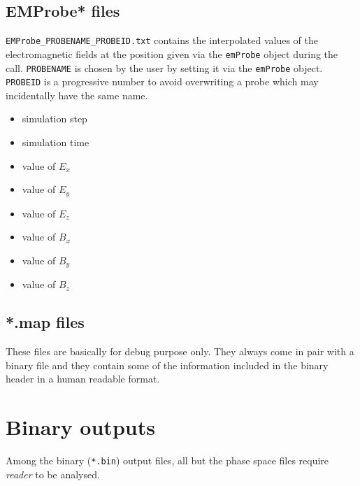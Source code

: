 \documentclass[11pt,a4paper]{report}
\begin{document}
\subsection{EMProbe* files}
\verb+EMProbe_PROBENAME_PROBEID.txt+ contains the interpolated values of the electromagnetic fields at the position given via the \verb+emProbe+ object during the call. \verb+PROBENAME+ is chosen by the user by setting it via the \verb+emProbe+ object. \verb+PROBEID+ is a progressive number to avoid overwriting a probe which may incidentally have the same name.
\begin{itemize}
\item simulation step
\item simulation time
\item value of $E_x$
\item value of $E_y$
\item value of $E_z$
\item value of $B_x$
\item value of $B_y$
\item value of $B_z$
\end{itemize}

\subsection{*.map files}
These files are basically for debug purpose only. They always come in pair with a binary file and they contain some of the information included in the binary header in a human readable format.

\section{Binary outputs}
Among the binary (\verb+*.bin+) output files, all but the phase space files require \emph{reader} to be analysed. 
\end{document}
